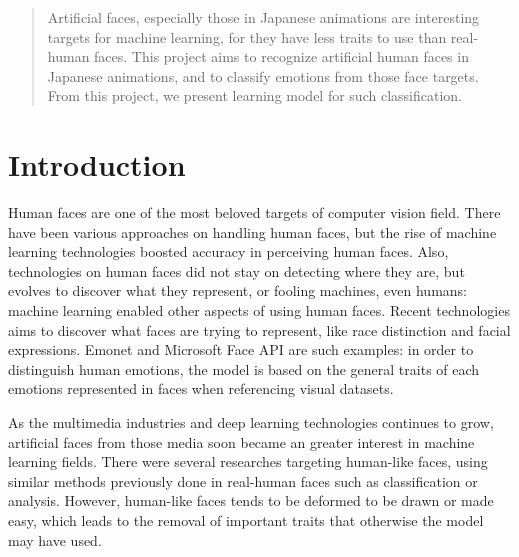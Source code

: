 \documentclass{article}
\begin{document}


\begin{abstract}

Artificial faces, especially those in Japanese animations are interesting targets for machine learning, for they have less traits to use than real-human faces. This project aims to recognize artificial human faces in Japanese animations, and to classify emotions from those face targets. From this project, we present learning model for such classification.

\end{abstract}


\section{Introduction}
\label{introduction}

Human faces are one of the most beloved targets of computer vision field.
There have been various approaches on handling human faces, but the rise of machine learning technologies boosted accuracy in perceiving human faces. \cite{sun2018face}
Also, technologies on human faces did not stay on detecting where they are, but evolves to discover what they represent, or fooling machines, even humans: machine learning enabled other aspects of using human faces.
Recent technologies aims to discover what faces are trying to represent, like race distinction\cite{vo2018race} and facial expressions.
Emonet and Microsoft Face API are such examples: in order to distinguish human emotions, the model is based on the general traits of each emotions represented in faces when referencing visual datasets\cite{DBLP:journals/corr/KahouBLGMKJFDBF15}.

As the multimedia industries and deep learning technologies continues to grow, artificial faces from those media soon became an greater interest in machine learning fields. There were several researches targeting human-like faces, using similar methods previously done in real-human faces such as classification or analysis\cite{peter2017darkflow}.
However, human-like faces tends to be deformed to be drawn or made easy, which leads to the removal of important traits that otherwise the model may have used.
\end{document}
